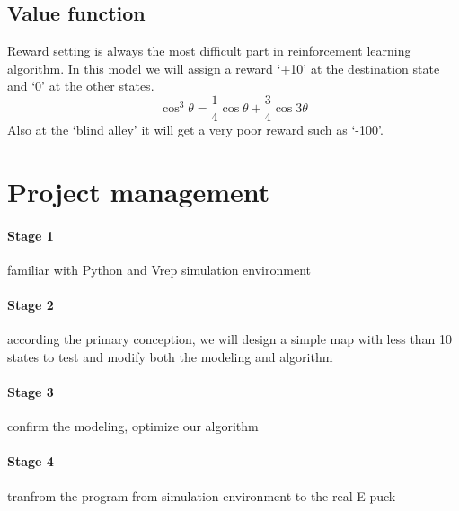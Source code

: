 \documentclass[
11pt, %
a4paper, %
oneside, %
headinclude%
BCOR3mm, %
]{scrartcl}
\begin{document}
\subsection{Value function}
Reward setting is always the most difficult part in reinforcement learning algorithm. 
In this model we will assign a reward ‘+10’ at the destination state and ‘0’ at the other states. 
\begin{equation}
\cos^3 \theta =\frac{1}{4}\cos\theta+\frac{3}{4}\cos 3\theta
\label{eq:refname2}
\end{equation}
Also at the ‘blind alley’ it will get a very poor reward such as ‘-100’.


\section{Project management}

\paragraph{Stage 1} familiar with Python and Vrep simulation environment

\paragraph{Stage 2} according the primary conception, 
we will design a simple map with less than 10 states to test and modify both the modeling and algorithm

\paragraph{Stage 3} confirm the modeling, optimize our algorithm
\paragraph{Stage 4} tranfrom the program from simulation environment to the real E-puck
\end{document}

